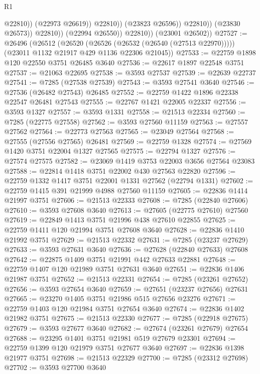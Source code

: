 \begin{lexlean}{R1}
\begin{coremodule}
                                  @22810))
                              (@22973 @26619))
                            @22810))
                        (@23823 @26596))
                      @22810))
                  (@23830 @26573))
                @22810))
            (@22994 @26550))
          @22810))
      (@23001 @26502))
@27527 := @26496
    (@26512
      (@26520 (@26526 (@26532 (@26540 (@27513 @22970)))))
      (@23011 @1132 @21917 @429 @1136 @22306 @21045))
@27533 := @22759 @1898 @120 @22550 @3751 @26485 @3640
@27536 := @22617 @1897 @22548 @3751
@27537 := @21063 @22695
@27538 := @3593 @27537
@27539 := @22639 @22737
@27541 := @7285 (@27538 @27539)
@27543 := @3593 @27541 @3640
@27546 := @27536 (@26482 @27543) @26485
@27552 := @22759 @1422 @1896 @22338 @22547 @26481 @27543
@27555 := @22767 @1421 @22005 @22337
@27556 := @3593 @1327
@27557 := @3593 @1331
@27558 := @21513 @22334
@27560 := @7285 (@22775 @27558)
@27562 := @3593 @27560 @11159
@27563 := @27557 @27562
@27564 := @22773 @27563
@27565 := @23049 @27564
@27568 := @27555 (@27556 @27565) @26481
@27569 := @22759 @1328
@27574 := @27569 @1420 @3751 @22004 @1327 @27565
@27575 := @22794 @1327
@27576 := @27574 @27575
@27582 := @23069 @1419 @3753 @22003 @3656 @27564 @23083
@27588 := @22814 @1418 @3751 @22002 @430 @27563 @22820
@27596 := @22759 @1332 @1417 @3751 @22001 @1331 @27562 (@22794 @1331)
@27602 := @22759 @1415 @391 @21999 @4988 @27560 @11159
@27605 := @22836 @1414 @21997 @3751
@27606 := @21513 @22333
@27608 := @7285 (@22840 @27606)
@27610 := @3593 @27608 @3640
@27613 := @27605 (@22775 @27610) @27560
@27619 := @22849 @1413 @3751 @21996 @438 @27610 @22855
@27625 := @22759 @1411 @120 @21994 @3751 @27608 @3640
@27628 := @22836 @1410 @21992 @3751
@27629 := @21513 @22332
@27631 := @7285 (@23237 @27629)
@27633 := @3593 @27631 @3640
@27636 := @27628 (@22840 @27633) @27608
@27642 := @22875 @1409 @3751 @21991 @442 @27633 @22881
@27648 := @22759 @1407 @120 @21989 @3751 @27631 @3640
@27651 := @22836 @1406 @21987 @3751
@27652 := @21513 @22331
@27654 := @7285 (@23261 @27652)
@27656 := @3593 @27654 @3640
@27659 := @27651 (@23237 @27656) @27631
@27665 := @23270 @1405 @3751 @21986 @515 @27656 @23276
@27671 := @22759 @1403 @120 @21984 @3751 @27654 @3640
@27674 := @22836 @1402 @21982 @3751
@27675 := @21513 @22330
@27677 := @7285 (@22918 @27675)
@27679 := @3593 @27677 @3640
@27682 := @27674 (@23261 @27679) @27654
@27688 := @23295 @1401 @3751 @21981 @519 @27679 @23301
@27694 := @22759 @1399 @120 @21979 @3751 @27677 @3640
@27697 := @22836 @1398 @21977 @3751
@27698 := @21513 @22329
@27700 := @7285 (@23312 @27698)
@27702 := @3593 @27700 @3640

\end{coremodule}
\end{lexlean}
